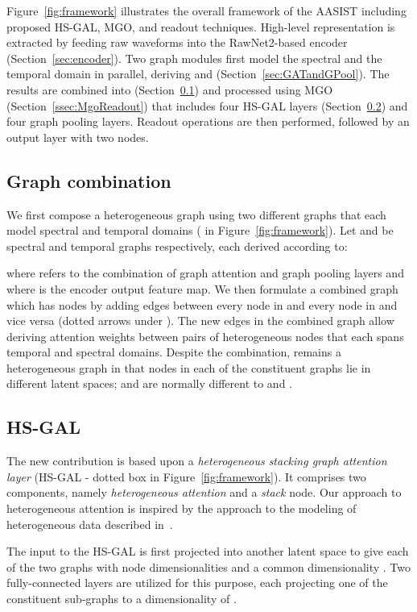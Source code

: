 \documentclass{article}
\begin{document}
Figure~\ref{fig:framework} illustrates the overall framework of the AASIST including proposed HS-GAL, MGO, and readout techniques. 
High-level representation  is extracted by feeding raw waveforms into the RawNet2-based encoder (Section~\ref{sec:encoder}). 
Two graph modules first model the spectral and the temporal domain in parallel, deriving  and  (Section~\ref{sec:GATandGPool}). 
The results are combined into  (Section~\ref{ssec:graphCombine}) and processed using MGO (Section~\ref{ssec:MgoReadout}) that includes four HS-GAL layers (Section~\ref{ssec:hetero}) and four graph pooling layers. 
Readout operations are then performed, followed by an output layer with two nodes.

\subsection{Graph combination}
\label{ssec:graphCombine}
We first compose a heterogeneous graph using two different graphs that each model spectral and temporal domains ( in Figure~\ref{fig:framework}). 
Let  and  be spectral and temporal graphs respectively, each derived according to:

where  refers to the combination of graph attention and graph pooling layers and where  is the encoder output feature map.
We then formulate a combined graph  which has  nodes by adding edges between every node in  and every node in  and vice versa (dotted arrows under ).
The new edges in the combined graph  allow deriving attention weights between pairs of heterogeneous nodes that each spans temporal and spectral domains.  
Despite the combination,  remains a heterogeneous graph in that nodes in each of the constituent graphs lie in different latent spaces;   and  are normally different to  and .   

\subsection{HS-GAL}
\label{ssec:hetero}
The new contribution is based upon a {\em heterogeneous stacking graph attention layer} (HS-GAL - dotted box in Figure~\ref{fig:framework}). 
It comprises two components, namely {\em heterogeneous attention} and a {\em stack} node.
Our approach to heterogeneous attention is inspired by the approach to the modeling of heterogeneous data described in~\cite{wang2019heterogeneous}. 

The input to the HS-GAL is first projected into another latent space to give each of the two graphs with node dimensionalities  and  a common dimensionality .
Two fully-connected layers are utilized for this purpose, each projecting one of the constituent sub-graphs to a dimensionality of .
\end{document}
